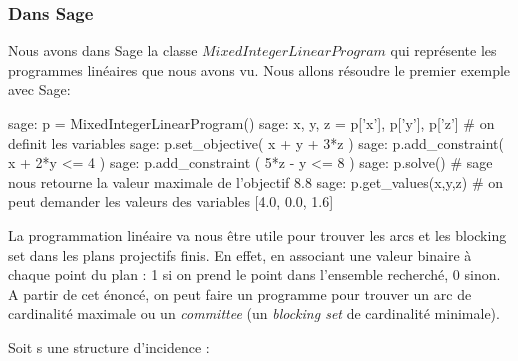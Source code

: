 \documentclass[a4paper]{article}
\begin{document}
\subsubsection{Dans Sage}
Nous avons dans Sage la classe $MixedIntegerLinearProgram$ qui représente les programmes linéaires que nous avons vu.
Nous allons résoudre le premier exemple avec Sage:
\begin{sageverbatim}
sage: p = MixedIntegerLinearProgram()
sage: x, y, z = p['x'], p['y'], p['z']    # on definit les variables
sage: p.set_objective( x + y + 3*z )
sage: p.add_constraint( x + 2*y <= 4 )
sage: p.add_constraint ( 5*z - y <= 8 )
sage: p.solve()         # sage nous retourne la valeur maximale de l'objectif
8.8
sage: p.get_values(x,y,z)    # on peut demander les valeurs des variables
[4.0, 0.0, 1.6]
\end{sageverbatim}

La programmation linéaire va nous être utile pour trouver les arcs et les blocking set dans les plans projectifs finis. En effet, en associant une valeur binaire à chaque point du plan : 1 si on prend le point dans l'ensemble recherché, 0 sinon.\\
A partir de cet énoncé, on peut faire un programme pour trouver un arc de cardinalité maximale ou un \textit{committee} (un \textit{blocking set} de cardinalité minimale).

Soit s une structure d'incidence :
\end{document}
